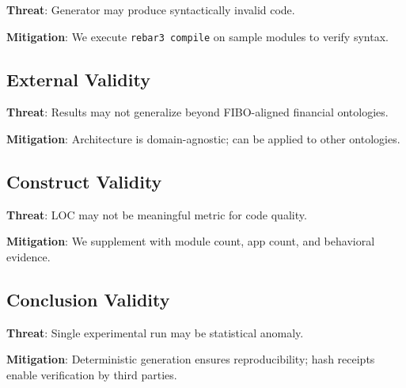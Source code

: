 \textbf{Threat}: Generator may produce syntactically invalid code.

\textbf{Mitigation}: We execute \texttt{rebar3 compile} on sample modules to verify syntax.

\subsection{External Validity}

\textbf{Threat}: Results may not generalize beyond FIBO-aligned financial ontologies.

\textbf{Mitigation}: Architecture is domain-agnostic; can be applied to other ontologies.

\subsection{Construct Validity}

\textbf{Threat}: LOC may not be meaningful metric for code quality.

\textbf{Mitigation}: We supplement with module count, app count, and behavioral evidence.

\subsection{Conclusion Validity}

\textbf{Threat}: Single experimental run may be statistical anomaly.

\textbf{Mitigation}: Deterministic generation ensures reproducibility; hash receipts enable verification by third parties.
